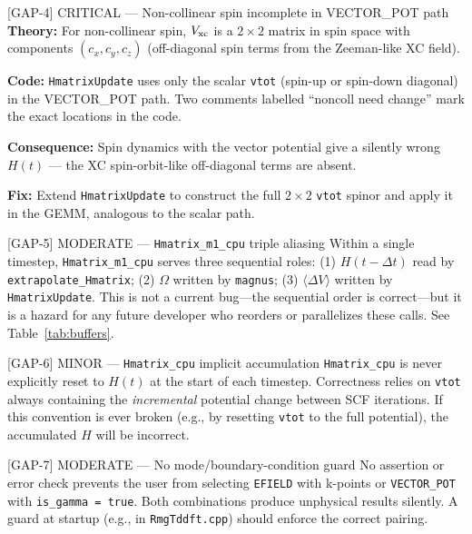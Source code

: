 \documentclass[12pt,letterpaper]{article}
\begin{document}
\begin{gapbox}{[GAP-4] CRITICAL --- Non-collinear spin incomplete in VECTOR\_POT path}
\textbf{Theory:} For non-collinear spin, $V_{\rm xc}$ is a $2\times2$ matrix in
spin space with components $(c_x, c_y, c_z)$ (off-diagonal spin terms from the
Zeeman-like XC field).

\textbf{Code:} \texttt{HmatrixUpdate} uses only the scalar \texttt{vtot} (spin-up
or spin-down diagonal) in the VECTOR\_POT path.  Two comments labelled
``noncoll need change'' mark the exact locations in the code.

\textbf{Consequence:} Spin dynamics with the vector potential give a silently
wrong $H(t)$ --- the XC spin-orbit-like off-diagonal terms are absent.

\textbf{Fix:} Extend \texttt{HmatrixUpdate} to construct the full $2\times2$
\texttt{vtot} spinor and apply it in the GEMM, analogous to the scalar path.
\end{gapbox}

\begin{gapboxmod}[label=gap:alias]{[GAP-5] MODERATE --- \texttt{Hmatrix\_m1\_cpu} triple aliasing}
\label{gap:alias}
Within a single timestep, \texttt{Hmatrix\_m1\_cpu} serves three sequential
roles: (1) $H(t-\Delta t)$ read by \texttt{extrapolate\_Hmatrix}; (2) $\Omega$
written by \texttt{magnus}; (3) $\langle\Delta V\rangle$ written by
\texttt{HmatrixUpdate}.  This is not a current bug---the sequential order is
correct---but it is a hazard for any future developer who reorders or parallelizes
these calls.  See Table~\ref{tab:buffers}.
\end{gapboxmod}

\begin{gapboxmin}{[GAP-6] MINOR --- \texttt{Hmatrix\_cpu} implicit accumulation}
\texttt{Hmatrix\_cpu} is never explicitly reset to $H(t)$ at the start of each
timestep.  Correctness relies on \texttt{vtot} always containing the
\emph{incremental} potential change between SCF iterations.  If this convention
is ever broken (e.g., by resetting \texttt{vtot} to the full potential), the
accumulated $H$ will be incorrect.
\end{gapboxmin}

\begin{gapboxmod}{[GAP-7] MODERATE --- No mode/boundary-condition guard}
No assertion or error check prevents the user from selecting
\texttt{EFIELD} with k-points or \texttt{VECTOR\_POT} with
\texttt{is\_gamma = true}.  Both combinations produce unphysical results
silently.  A guard at startup (e.g., in \texttt{RmgTddft.cpp}) should
enforce the correct pairing.
\end{gapboxmod}
\end{document}
